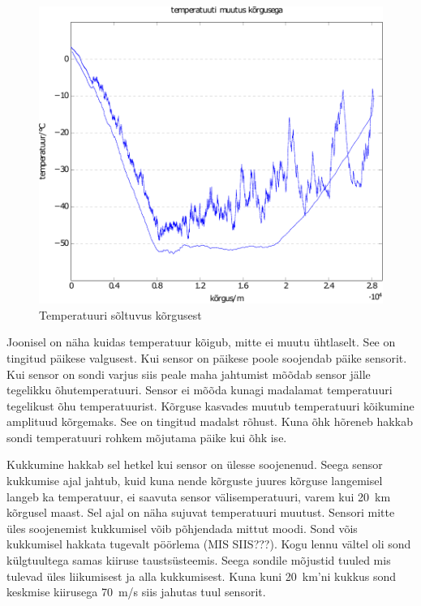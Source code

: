\documentclass{trkut}%
\begin{document}
\begin{figure}[h]
	\includegraphics[width=1\textwidth]{PicGra/tempkõr.pdf}
	\caption{Temperatuuri sõltuvus kõrgusest}
	\label{TempKõrgus}%
\end{figure}

Joonisel on näha kuidas temperatuur kõigub, mitte ei muutu ühtlaselt. See on tingitud päikese valgusest. Kui sensor on päikese poole soojendab päike sensorit. Kui sensor on sondi varjus siis peale maha jahtumist mõõdab sensor jälle tegelikku õhutemperatuuri. Sensor ei mõõda kunagi madalamat temperatuuri tegelikust õhu temperatuurist. Kõrguse kasvades muutub temperatuuri kõikumine amplituud kõrgemaks. See on tingitud madalst rõhust. Kuna õhk hõreneb hakkab sondi temperatuuri rohkem mõjutama päike kui õhk ise.

Kukkumine hakkab sel hetkel kui sensor on ülesse soojenenud. Seega sensor kukkumise ajal jahtub, kuid kuna nende kõrguste juures kõrguse langemisel langeb ka temperatuur, ei saavuta sensor välisemperatuuri, varem kui \SI{20}{km} kõrgusel maast. Sel ajal on näha sujuvat temperatuuri muutust. Sensori mitte üles soojenemist kukkumisel võib põhjendada mittut moodi. Sond võis kukkumisel hakkata tugevalt pöörlema (MIS SIIS???). Kogu lennu vältel oli sond külgtuultega samas kiiruse taustsüsteemis. Seega sondile mõjustid tuuled mis tulevad üles liikumisest ja alla kukkumisest. Kuna kuni \SI{20}{km}'ni kukkus sond keskmise kiirusega \SI{70}{m/s} siis jahutas tuul sensorit.
\end{document}
